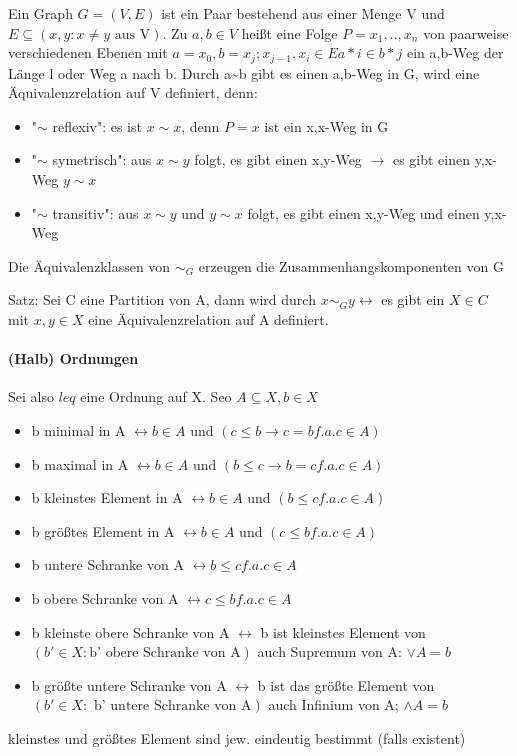 \documentclass[10pt,landscape]{article}
\begin{document}
\begin{multicols}{3}
Ein Graph $G=(V,E)$ ist ein Paar bestehend aus einer Menge V und $E\subseteq (x,y: x\not = y \text{ aus V} )$.
Zu $a,b\in V$ heißt eine Folge $P=x_1,..,x_n$ von paarweise verschiedenen Ebenen mit $a=x_0, b=x_j; x_{j-1},x_i \in E{a*i \in b*j}$ ein a,b-Weg der Länge l oder Weg a nach b. Durch a\sim b gibt es einen a,b-Weg in G, wird eine Äquivalenzrelation auf V definiert, denn:
\begin{itemize}
    \item "$\sim$ reflexiv": es ist $x\sim x$, denn $P=x$ ist ein x,x-Weg in G
    \item "$\sim$ symetrisch": aus $x\sim y$ folgt, es gibt einen x,y-Weg $\rightarrow$ es gibt einen y,x-Weg $y\sim x$
    \item "$\sim$ transitiv": aus $x\sim y$ und $y\sim x$ folgt, es gibt einen x,y-Weg und einen y,x-Weg
\end{itemize}
Die Äquivalenzklassen von $\sim _G$ erzeugen die Zusammenhangskomponenten von G

Satz: Sei C eine Partition von A, dann wird durch $x\sim _G y \leftrightarrow$ es gibt ein $X\in C$ mit $x,y\in X$ eine Äquivalenzrelation auf A definiert.

\paragraph{(Halb) Ordnungen}
Sei also $leq$ eine Ordnung auf X. Seo $A\subseteq X, b\in X$
\begin{itemize}
    \item b minimal in A $\leftrightarrow b\in A$ und $(c\leq b \rightarrow c=b f.a. c\in A)$
    \item b maximal in A $\leftrightarrow b\in A$ und $(b\leq c \rightarrow b=c f.a. c\in A)$
    \item b kleinstes Element in A $\leftrightarrow b\in A$ und $(b\leq c f.a. c\in A)$
    \item b größtes Element in A $\leftrightarrow b\in A$ und $(c\leq b f.a. c\in A)$
    \item b untere Schranke von A $\leftrightarrow b\leq c f.a. c\in A$
    \item b obere Schranke von A $\leftrightarrow c\leq b f.a. c\in A$
    \item b kleinste obere Schranke von A $\leftrightarrow$ b ist kleinstes Element von $(b'\in X: \text{b' obere Schranke von A})$ auch Supremum von A: $\lor A = b$
    \item b größte untere Schranke von A $\leftrightarrow$ b ist das größte Element von $(b'\in X: \text{ b' untere Schranke von A} )$ auch Infinium von A; $\land A = b$
\end{itemize}
kleinstes und größtes Element sind jew. eindeutig bestimmt (falls existent)


\end{multicols}
\end{document}
